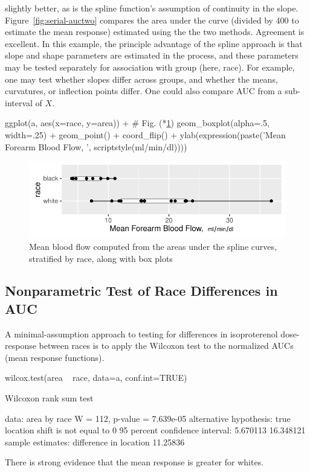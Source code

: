 slightly better, as is the spline function's assumption of continuity in the
slope.  Figure~\ref{fig:serial-auctwo} compares the area under the curve (divided
by 400 to estimate the mean response) estimated using the the two methods.
Agreement is excellent.  In this example, the principle advantage of the spline
approach is that slope and shape parameters are estimated in the process, and
these parameters may be tested separately for association with group (here,
race).  For example, one may test whether slopes differ across groups, and
whether the means, curvatures, or inflection points differ.  One could
also compare AUC from a sub-interval of $X$.
\begin{Schunk}
\begin{Sinput}
ggplot(a, aes(x=race, y=area)) +    # Fig. (*\ref{fig:serial-auc}\ipacue*)
  geom_boxplot(alpha=.5, width=.25) + geom_point() + coord_flip() +
  ylab(expression(paste('Mean Forearm Blood Flow,  ', scriptstyle(ml/min/dl))))
\end{Sinput}
\begin{figure}[htbp]

\centerline{\includegraphics{serial-auc-1} }

\caption[Mean blood flow by race]{Mean blood flow computed from the areas under the spline curves, stratified by race, along with box plots}\label{fig:serial-auc}
\end{figure}
\end{Schunk}
\clearpage

\subsection{Nonparametric Test of Race Differences in AUC}\ipacue
A minimal-assumption approach to testing for differences in
isoproterenol dose-response between races is to apply the Wilcoxon
test to the normalized AUCs (mean response functions).
\begin{Schunk}
\begin{Sinput}
wilcox.test(area ~ race, data=a, conf.int=TRUE)
\end{Sinput}
\begin{Soutput}

	Wilcoxon rank sum test

data:  area by race
W = 112, p-value = 7.639e-05
alternative hypothesis: true location shift is not equal to 0
95 percent confidence interval:
  5.670113 16.348121
sample estimates:
difference in location 
              11.25836 
\end{Soutput}
\end{Schunk}
There is strong evidence that the mean response is greater for whites.

